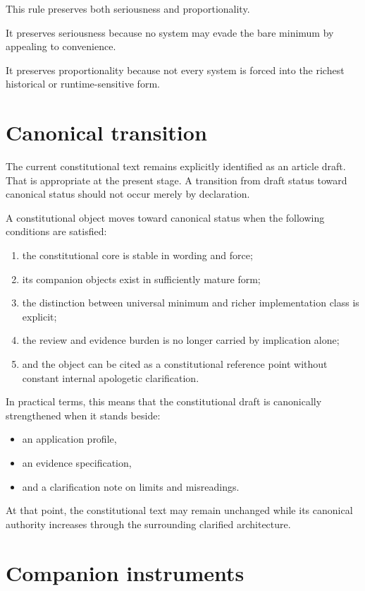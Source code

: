 \documentclass[11pt]{article}
\begin{document}
This rule preserves both seriousness and proportionality.

It preserves seriousness because no system may evade the bare minimum by appealing to convenience.

It preserves proportionality because not every system is forced into the richest historical or runtime-sensitive form.

\section{Canonical transition}

The current constitutional text remains explicitly identified as an article draft. That is appropriate at the present stage. A transition from draft status toward canonical status should not occur merely by declaration.

A constitutional object moves toward canonical status when the following conditions are satisfied:

\begin{enumerate}[leftmargin=2em,label=\arabic*.]
    \item the constitutional core is stable in wording and force;
    \item its companion objects exist in sufficiently mature form;
    \item the distinction between universal minimum and richer implementation class is explicit;
    \item the review and evidence burden is no longer carried by implication alone;
    \item and the object can be cited as a constitutional reference point without constant internal apologetic clarification.
\end{enumerate}

In practical terms, this means that the constitutional draft is canonically strengthened when it stands beside:
\begin{itemize}[leftmargin=2em]
    \item an application profile,
    \item an evidence specification,
    \item and a clarification note on limits and misreadings.
\end{itemize}

At that point, the constitutional text may remain unchanged while its canonical authority increases through the surrounding clarified architecture.

\section{Companion instruments}
\end{document}
